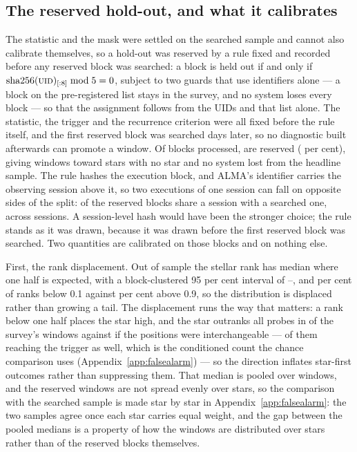 \subsection{The reserved hold-out, and what it calibrates}
\label{sec:heldout}

The statistic and the mask were settled on the searched sample and cannot also
calibrate themselves, so a hold-out was reserved by a rule fixed and recorded
before any reserved block was searched: a block is held out if and only if
$\mathrm{sha256}(\textsc{uid})_{[:8]} \bmod 5 = 0$, subject to two guards that
use identifiers alone --- a block on the pre-registered list stays in the
survey, and no system loses every block --- so that the assignment follows
from the UIDs and that list alone. The statistic, the trigger and the
recurrence criterion were all fixed before the rule itself, and the first
reserved block was searched \HoLeadBlockDays{} days later, so no diagnostic
built afterwards can promote a window. Of
\NEbProcessedAll{} blocks processed, \NEbHeldOut{} are reserved (\HoPctHeld{} per cent), giving
\HoWin{} windows toward \HoStars{} stars with no star and no system lost
from the headline sample. The rule hashes the execution block, and ALMA's
identifier carries the observing session above it, so two executions of one
session can fall on opposite sides of the split: \BkSessHoBlocks{} of the
\NEbHeldOut{} reserved blocks share a session with a searched one, across
\BkSessShared{} sessions. A session-level hash would have been the stronger
choice; the rule stands as it was drawn, because it was drawn before the
first reserved block was searched. Two quantities are calibrated on those
blocks and on nothing else.

First, the rank displacement. Out of sample the stellar rank has median
\HoRankMed{} where one half is expected, with a block-clustered 95 per cent
interval of \HoRankMedLo--\HoRankMedHi, and \HOFracLoPct{} per cent of ranks
below 0.1 against \HOFracHiPct{} per cent above 0.9, so the distribution is
displaced rather than growing a tail. The displacement runs the way that
matters: a rank below one half places the star high, and the star outranks
all \NCtrl{} probes in \NsrFirstObs{} of the survey's windows against
\NsrFirstExp{} if the positions were interchangeable --- \NStageOneFine{} of
them reaching the trigger as well, which is the conditioned count the chance
comparison uses (Appendix~\ref{app:falsealarm}) --- so the direction
inflates star-first outcomes rather than suppressing them.
That median is pooled over windows, and the reserved windows are not spread
evenly over stars, so the comparison with the searched sample is made star by
star in Appendix~\ref{app:falsealarm}: the two samples agree once each star
carries equal weight, and the gap between the pooled medians is a property of
how the windows are distributed over stars rather than of the reserved blocks
themselves.

